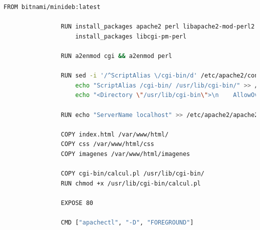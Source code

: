 \documentclass{article}
\begin{document}
         \begin{lstlisting}[language=bash,caption={}, label={lst:color-boton}]
                FROM bitnami/minideb:latest

                RUN install_packages apache2 perl libapache2-mod-perl2 && \
                    install_packages libcgi-pm-perl
                
                RUN a2enmod cgi && a2enmod perl
                
                RUN sed -i '/^ScriptAlias \/cgi-bin/d' /etc/apache2/conf-enabled/serve-cgi-bin.conf && \
                    echo "ScriptAlias /cgi-bin/ /usr/lib/cgi-bin/" >> /etc/apache2/conf-enabled/serve-cgi-bin.conf && \
                    echo "<Directory \"/usr/lib/cgi-bin\">\n    AllowOverride None\n    Options +ExecCGI\n    Require all granted\n</Directory>" >> /etc/apache2/conf-enabled/serve-cgi-bin.conf
                
                RUN echo "ServerName localhost" >> /etc/apache2/apache2.conf
                
                COPY index.html /var/www/html/
                COPY css /var/www/html/css
                COPY imagenes /var/www/html/imagenes
                
                COPY cgi-bin/calcul.pl /usr/lib/cgi-bin/
                RUN chmod +x /usr/lib/cgi-bin/calcul.pl
                
                EXPOSE 80
                
                CMD ["apachectl", "-D", "FOREGROUND"]

         \end{lstlisting}
    
\end{document}

